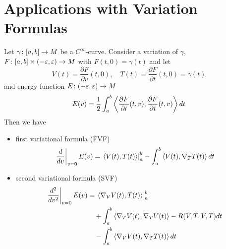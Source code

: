 \section{Applications with Variation Formulas}
Let $\gamma \colon [a,b] \rightarrow M$ be a $C^\infty$-curve. Consider a variation of $\gamma$, $F \colon [a,b] \times (-\varepsilon,\varepsilon) \rightarrow M$ with $F(t,0) = \gamma(t)$ and let
\begin{equation*}
	V(t) = \frac{\partial F}{\partial v}(t,0),\quad T(t) =\frac{\partial F}{\partial t}(t,0) = \dot{\gamma}(t)
\end{equation*}
and energy function $E \colon (-\varepsilon,\varepsilon) \rightarrow M$
\begin{equation*}
	E(v) =\frac{1}{2}\int_a^b\left\langle \frac{\partial F}{\partial t}(t,v),\frac{\partial F}{\partial t}(t,v) \right\rangle dt
\end{equation*}
Then we have
\begin{itemize}
	\item first variational formula (FVF)
	\begin{equation*}
		\left.\frac{d}{dv}\right\lvert_{v=0}E(v) = \left.\left\langle V(t),T(t) \right\rangle\right\lvert_a^b - \int_a^b \left\langle V(t),\nabla_TT(t) \right\rangle dt
	\end{equation*}
	\item second variational formula (SVF)
	\begin{equation*}
		\begin{aligned}
			\left.\frac{d^2}{dv^2}\right\lvert_{v=0}E(v) &= \left.\left\langle \nabla_VV(t),T(t) \right\rangle\right\lvert_a^b \\
			&\quad + \int_a^b \left\langle \nabla_TV(t),\nabla_TV(t) \right\rangle -R(V,T,V,T)dt\\
			&\quad - \int_a^b \left\langle \nabla_VV(t),\nabla_TT(t) \right\rangle dt
		\end{aligned}
	\end{equation*}
\end{itemize}


